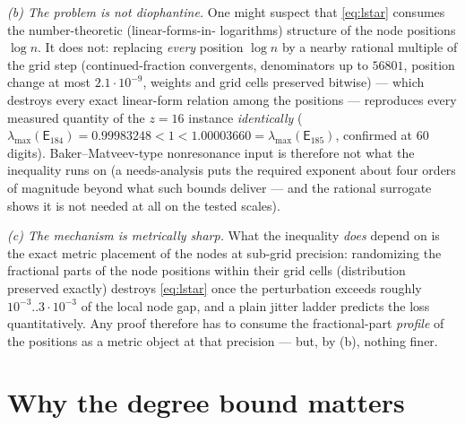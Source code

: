 \documentclass[11pt]{article}
\theoremstyle{remark}
\newcommand{\E}{\mathsf{E}}
\begin{document}
\emph{(b) The problem is not diophantine.}  One might suspect that
\eqref{eq:lstar} consumes the number-theoretic (linear-forms-in-
logarithms) structure of the node positions $\log n$.  It does not:
replacing \emph{every} position $\log n$ by a nearby rational multiple
of the grid step (continued-fraction convergents, denominators up to
$56801$, position change at most $2.1\cdot10^{-9}$, weights and grid
cells preserved bitwise) --- which destroys every exact linear-form
relation among the positions --- reproduces every measured quantity of
the $z=16$ instance \emph{identically} ($\lambda_{\max}(\E_{184})=
0.99983248<1<1.00003660=\lambda_{\max}(\E_{185})$, confirmed at
$60$ digits).  Baker--Matveev-type nonresonance input is therefore not
what the inequality runs on (a needs-analysis puts the required
exponent about four orders of magnitude beyond what such bounds
deliver --- and the rational surrogate shows it is not needed at all
on the tested scales).

\emph{(c) The mechanism is metrically sharp.}  What the inequality
\emph{does} depend on is the exact metric placement of the nodes at
sub-grid precision: randomizing the fractional parts of the node
positions within their grid cells (distribution preserved exactly)
destroys \eqref{eq:lstar} once the perturbation exceeds roughly
$10^{-3}..3\cdot10^{-3}$ of the local node gap, and a plain jitter
ladder predicts the loss quantitatively.  Any proof therefore has to
consume the fractional-part \emph{profile} of the positions as a
metric object at that precision --- but, by (b), nothing finer.

\section{Why the degree bound matters}\label{sec:degree}
\end{document}
